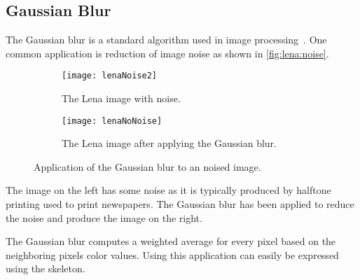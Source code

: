 \subsection{Gaussian Blur}
\label{sec:gauss}
The Gaussian blur is a standard algorithm used in image processing~\cite{Umbaugh1997}.
One common application is reduction of image noise as shown in \autoref{fig:lena:noise}.
%
\begin{figure}[tb]
  \centering
  \begin{subfigure}[t]{.45\textwidth}
    \texttt{[image: lenaNoise2]}
    \caption{The Lena image with noise.}
    \label{fig:lena:noise:yes}
  \end{subfigure}
  \hfill
  \begin{subfigure}[t]{.45\textwidth}
    \texttt{[image: lenaNoNoise]}
    \caption{The Lena image after applying the Gaussian blur.}
    \label{fig:lena:noise:no}
  \end{subfigure}
  \caption{Application of the Gaussian blur to an noised image.}
  \label{fig:lena:noise}
\end{figure}
%
The image on the left has some noise as it is typically produced by halftone printing used to print newspapers.
The Gaussian blur has been applied to reduce the noise and produce the image on the right.

The Gaussian blur computes a weighted average for every pixel based on the neighboring pixels color values.
Using \SkelCL this application can easily be expressed using the \stencil skeleton.

